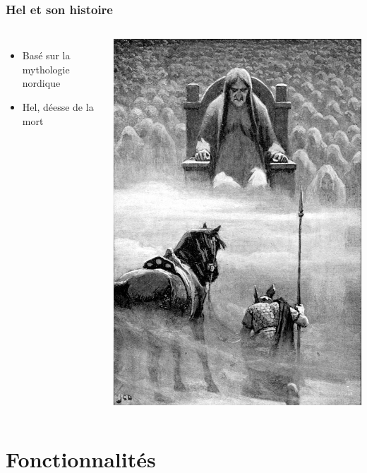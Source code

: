 \documentclass{beamer}
\begin{document}
\begin{frame}
\frametitle{Hel et son histoire}
\begin{columns}
\begin{itemize}
	\item Basé sur la mythologie nordique
	\item Hel, déesse de la mort
\end{itemize}
\begin{center}
\includegraphics[width=.75\textwidth]{img/Hel_goddess_of_death.jpg}
\end{center}
\end{columns}
\end{frame}

\section{Fonctionnalités}
\subsection{}
\end{document}
